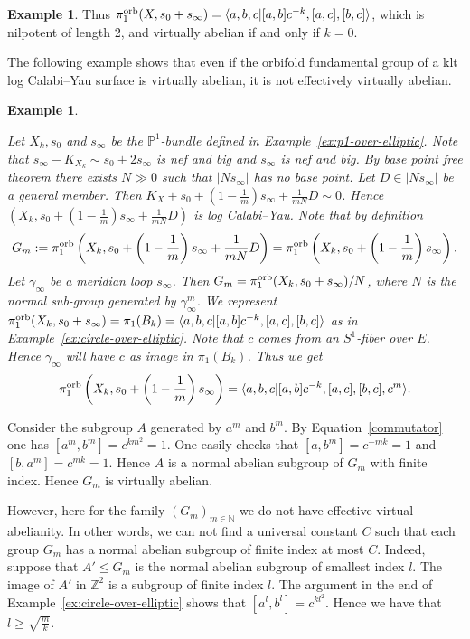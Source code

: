 \documentclass{amsart}
\newcommand{\nn}{\mathbb{N}}
\theoremstyle{definition}
\newtheorem{example}[theorem]{Example}
\theoremstyle{remark}
\numberwithin{equation}{section}
\begin{document}
\begin{example}
{Thus $\pi_1^{\rm orb}(X,s_0+s_\infty)=\langle a,b,c|[a,b]c^{-k},[a,c],[b,c]\rangle$, which is nilpotent of length 2, and virtually abelian if and only if $k=0$.
}
\end{example}

The following example shows that
even if the orbifold fundamental group of a klt log Calabi--Yau surface is virtually abelian, it is not effectively
virtually abelian.
\begin{example}\label{ex:p1-over-elliptic-standard}
{\em 
Let $X_k,s_0$ and $s_\infty$ be the $\mathbb{P}^1$-bundle defined in Example~\ref{ex:p1-over-elliptic}. 
Note that $s_\infty-K_{X_k}\sim s_0+2s_\infty$ is nef and big and $s_\infty$ is nef and big. By base point free theorem there exists $N\gg 0$ such that $|Ns_\infty|$ has no base point. Let $D\in |Ns_\infty|$ be a general member. Then $K_X+s_0+(1-\frac{1}{m})s_\infty+\frac{1}{mN}D\sim 0$. Hence $(X_k,s_0+(1-\frac{1}{m})s_\infty+\frac{1}{mN}D)$ is log Calabi--Yau. Note that by definition 
\[
G_m:=\pi_1^{\rm orb}\left(X_k,s_0+\left(1-\frac{1}{m}\right)s_\infty+\frac{1}{mN}D\right)=\pi_1^{\rm orb}\left(X_k,s_0+\left(1-\frac{1}{m}\right)s_\infty\right).
\]
Let $\gamma_\infty$ be a meridian loop $s_\infty$. Then $G_{m}=\pi_1^{\rm orb}(X_k,s_0+s_\infty)/N$, where $N$ is the normal sub-group generated by $\gamma_\infty^m$. We represent $\pi_1^{\rm orb}(X_k,s_0+s_\infty)=\pi_1(B_k)=\langle a,b,c|[a,b]c^{-k},[a,c],[b,c]\rangle$ as in Example~\ref{ex:circle-over-elliptic}. Note that $c$ comes from an $S^1$-fiber over $E$. Hence $\gamma_\infty$ will have $c$ as image in $\pi_1(B_k)$. Thus we get 
\begin{equation*}
    \pi_1^{\rm orb}\left(X_k,s_0+\left(1-\frac{1}{m}\right)s_\infty\right)=\langle a,b,c|[a,b]c^{-k},[a,c],[b,c],c^{m}\rangle.
\end{equation*}

 Consider the subgroup $A$ generated by $a^m$ and $b^m$. By Equation~\ref{commutator} one has $[a^m,b^m]=c^{km^2}=1$. One easily checks that $[a,b^m]=c^{-mk}=1$ and $[b,a^m]=c^{mk}=1$. Hence $A$ is a normal abelian subgroup of $G_{m}$ with finite index. Hence $G_m$ is virtually abelian. 

However, here for the family $(G_m)_{m\in \nn}$ we do not have effective virtual abelianity. In other words, we can not find a universal constant $C$ such that each group $G_{m}$ has a normal abelian subgroup of finite index at most $C$.
Indeed, suppose that $A'\leqslant G_{m}$ is the normal abelian subgroup of smallest index $l$. The image of $A'$ in $\mathbb{Z}^2$ is a subgroup of finite index $l$. The argument in the end of Example~\ref{ex:circle-over-elliptic} shows that $[a^l,b^l]=c^{kl^2}$. Hence we have that $l\geq \sqrt{\frac{m}{k}}$.

}
\end{example}
\end{document}

